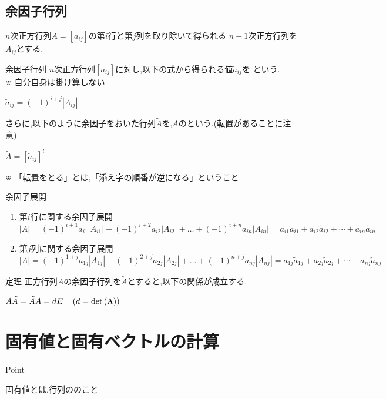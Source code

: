 \documentclass[a4paper]{jsarticle}
\begin{document}
\subsection{余因子行列}
$n$次正方行列$A=\left[a_{ij}\right]$の第$i$行と第$j$列を取り除いて得られる
$n-1$次正方行列を$A_{ij}$とする.
\begin{itembox}[l]{余因子行列}
    $n$次正方行列$\left[a_{ij}\right]$に対し,以下の式から得られる値$\tilde{a}_{ij}$を
    という.\\
    ※ 自分自身は掛け算しない
    \begin{center}
        $\tilde{a}_{ij}=\left(-1\right)^{i+j}\left|A_{ij}\right|$
    \end{center}
    さらに,以下のように余因子をおいた行列$\tilde{A}$を,$A$のという.(転置があることに注意)
    \begin{center}
        $\tilde{A}=\left[\tilde{a}_{ij}\right]^t$
    \end{center}
    ※ 「転置をとる」とは,「添え字の順番が逆になる」ということ
\end{itembox}
\begin{itembox}[l]{余因子展開}
    \begin{enumerate}[(1)]
        \item 第$i$行に関する余因子展開\\
              $\left|A\right|=(-1)^{i+1}a_{i1}\left|A_{i1}\right|+(-1)^{i+2}a_{i2}\left|A_{i2}\right|+ \dots +(-1)^{i+n}a_{in}\left|A_{in}\right|
                  =a_{i1}\tilde{a}_{i1}+a_{i2}\tilde{a}_{i2}+\cdots +a_{in}\tilde{a}_{in}$
        \item 第$j$列に関する余因子展開\\
              $\left|A\right|=(-1)^{1+j}a_{1j}\left|A_{1j}\right|+(-1)^{2+j}a_{2j}\left|A_{2j}\right|+ \dots +(-1)^{n+j}a_{nj}\left|A_{nj}\right|
                  =a_{1j}\tilde{a}_{1j}+a_{2j}\tilde{a}_{2j}+\cdots +a_{nj}\tilde{a}_{nj}$
    \end{enumerate}
\end{itembox}
\begin{itembox}[l]{定理}
    正方行列$A$の余因子行列を$\tilde{A}$とすると,以下の関係が成立する.
    \begin{center}
        $A\tilde{A}=\tilde{A}A=dE\quad\left(d=\rm{det}\left(A\right)\right)$
    \end{center}
\end{itembox}
\section{固有値と固有ベクトルの計算}
\begin{itembox}[l]{Point}
    \begin{center}
        固有値とは,行列ののこと
    \end{center}
\end{itembox}
\end{document}
